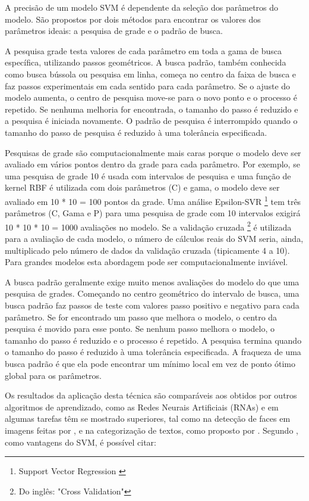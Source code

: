 A precisão de um modelo SVM é dependente da seleção dos parâmetros do modelo. São propostos por  dois métodos para encontrar os valores dos parâmetros ideais: a pesquisa de grade e o padrão de busca. 

A pesquisa grade testa valores de cada parâmetro em toda a gama de busca específica, utilizando passos geométricos. 
A busca padrão, também conhecida como busca bússola ou pesquisa em linha, começa no centro da faixa de busca e faz passos experimentais em cada sentido para cada parâmetro. Se o ajuste do modelo aumenta, o centro de pesquisa move-se para o novo ponto e o processo é repetido. Se nenhuma melhoria for encontrada, o tamanho do passo é reduzido e a pesquisa é iniciada novamente. O padrão de pesquisa é interrompido quando o tamanho do passo de pesquisa é reduzido à uma tolerância especificada.

Pesquisas de grade são computacionalmente mais caras porque o modelo deve ser avaliado em vários pontos dentro da grade para cada parâmetro. Por exemplo, se uma pesquisa de grade 10 é usada com intervalos de pesquisa e uma função de kernel RBF é utilizada com dois parâmetros (C) e gama, o modelo deve ser avaliado em 10 * 10 = 100 pontos da grade. Uma análise Epsilon-SVR \footnote{Support Vector Regression \cite{scikit-learn}} tem três parâmetros (C, Gama e P) para uma pesquisa de grade com 10 intervalos exigirá 10 * 10 * 10 = 1000 avaliações no modelo. Se a validação cruzada \footnote{Do inglês: "Cross Validation"} é utilizada para a avaliação de cada modelo, o número de cálculos reais do SVM seria, ainda, multiplicado pelo número de dados da validação cruzada (tipicamente 4 a 10). Para grandes modelos esta abordagem pode ser computacionalmente inviável.

A busca padrão geralmente exige muito menos avaliações do modelo do que uma pesquisa de grades. Começando no centro geométrico do intervalo de busca, uma busca padrão faz passos de teste com valores passo positivo e negativo para cada parâmetro. Se for encontrado um passo que melhora o modelo, o centro da pesquisa é movido para esse ponto. Se nenhum passo melhora o modelo, o tamanho do passo é reduzido e o processo é repetido. A pesquisa termina quando o tamanho do passo é reduzido à uma tolerância especificada. A fraqueza de uma busca padrão é que ela pode encontrar um mínimo local em vez de ponto ótimo global para os parâmetros.

Os resultados da aplicação desta técnica são comparáveis aos obtidos por outros algoritmos de aprendizado, como as Redes Neurais Artificiais (RNAs) \cite{Haykin} e em algumas tarefas têm se mostrado superiores, tal como na detecção de faces em imagens feitas por , e na categorização de textos, como proposto por . 
Segundo , como vantagens do SVM, é possível citar: 

